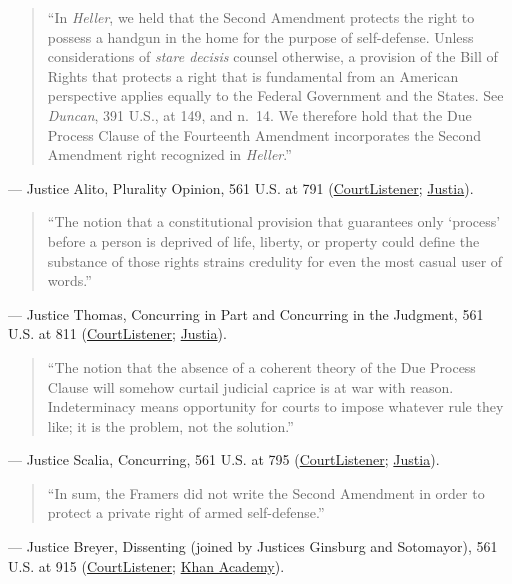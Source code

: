 \documentclass[12pt]{article}
\begin{document}
\begin{quote}
``In \textit{Heller}, we held that the Second Amendment protects the right to possess a handgun in the home for the purpose of self-defense. Unless considerations of \textit{stare decisis} counsel otherwise, a provision of the Bill of Rights that protects a right that is fundamental from an American perspective applies equally to the Federal Government and the States. See \textit{Duncan}, 391 U.S., at 149, and n.~14. We therefore hold that the Due Process Clause of the Fourteenth Amendment incorporates the Second Amendment right recognized in \textit{Heller}.''
\end{quote}
--- Justice Alito, Plurality Opinion, 561 U.S. at 791 (\href{https://www.courtlistener.com/opinion/149702/mcdonald-v-city-of-chicago/}{CourtListener}; \href{https://supreme.justia.com/cases/federal/us/561/742/}{Justia}).

\begin{quote}
``The notion that a constitutional provision that guarantees only `process' before a person is deprived of life, liberty, or property could define the substance of those rights strains credulity for even the most casual user of words.''
\end{quote}
--- Justice Thomas, Concurring in Part and Concurring in the Judgment, 561 U.S. at 811 (\href{https://www.courtlistener.com/opinion/149702/mcdonald-v-city-of-chicago/}{CourtListener}; \href{https://supreme.justia.com/cases/federal/us/561/742/}{Justia}).

\begin{quote}
``The notion that the absence of a coherent theory of the Due Process Clause will somehow curtail judicial caprice is at war with reason. Indeterminacy means opportunity for courts to impose whatever rule they like; it is the problem, not the solution.''
\end{quote}
--- Justice Scalia, Concurring, 561 U.S. at 795 (\href{https://www.courtlistener.com/opinion/149702/mcdonald-v-city-of-chicago/}{CourtListener}; \href{https://supreme.justia.com/cases/federal/us/561/742/}{Justia}).

\begin{quote}
``In sum, the Framers did not write the Second Amendment in order to protect a private right of armed self-defense.''
\end{quote}
--- Justice Breyer, Dissenting (joined by Justices Ginsburg and Sotomayor), 561 U.S. at 915 (\href{https://www.courtlistener.com/opinion/149702/mcdonald-v-city-of-chicago/}{CourtListener}; \href{https://www.khanacademy.org/humanities/constitution-101/x7a03a96a83aa80ff:the-bill-of-rights/x7a03a96a83aa80ff:second-amendment-modern-cases-and-debates/a/primary-source-mcdonald-v-city-of-chicago-2012}{Khan Academy}).
\end{document}
